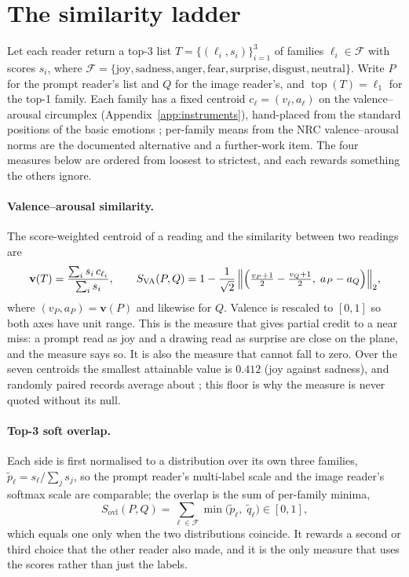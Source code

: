 \section{The similarity ladder}
\label{sec:method-measures}

Let each reader return a top-3 list $T = \{(\ell_i, s_i)\}_{i=1}^{3}$ of families $\ell_i \in \mathcal{F}$ with scores $s_i$, where $\mathcal{F} = \{\text{joy}, \text{sadness}, \text{anger}, \text{fear}, \text{surprise}, \text{disgust}, \text{neutral}\}$. Write $P$ for the prompt reader's list and $Q$ for the image reader's, and $\operatorname{top}(T) = \ell_1$ for the top-1 family. Each family has a fixed centroid $c_\ell = (v_\ell, a_\ell)$ on the valence--arousal circumplex (Appendix~\ref{app:instruments}), hand-placed from the standard positions of the basic emotions \cite{russell1980circumplex}; per-family means from the NRC valence--arousal norms \cite{mohammad2018obtaining} are the documented alternative and a further-work item. The four measures below are ordered from loosest to strictest, and each rewards something the others ignore.

\paragraph{Valence--arousal similarity.} The score-weighted centroid of a reading and the similarity between two readings are
\begin{equation}
\mathbf{v}(T) = \frac{\sum_i s_i\, c_{\ell_i}}{\sum_i s_i}, \qquad
S_{\mathrm{VA}}(P, Q) = 1 - \frac{1}{\sqrt{2}}\,\Bigl\|\Bigl(\tfrac{v_P + 1}{2} - \tfrac{v_Q + 1}{2},\; a_P - a_Q\Bigr)\Bigr\|_2 ,
\label{eq:va}
\end{equation}
where $(v_P, a_P) = \mathbf{v}(P)$ and likewise for $Q$. Valence is rescaled to $[0,1]$ so both axes have unit range. This is the measure that gives partial credit to a near miss: a prompt read as joy and a drawing read as surprise are close on the plane, and the measure says so. It is also the measure that cannot fall to zero. Over the seven centroids the smallest attainable value is $0.412$ (joy against sadness), and randomly paired records average about \FullNeuVaNull{}; this floor is why the measure is never quoted without its null.

\paragraph{Top-3 soft overlap.} Each side is first normalised to a distribution over its own three families, $\tilde{p}_\ell = s_\ell / \sum_j s_j$, so the prompt reader's multi-label scale and the image reader's softmax scale are comparable; the overlap is the sum of per-family minima,
\begin{equation}
S_{\mathrm{ovl}}(P, Q) = \sum_{\ell \in \mathcal{F}} \min\bigl(\tilde{p}_\ell,\; \tilde{q}_\ell\bigr) \in [0, 1],
\label{eq:overlap}
\end{equation}
which equals one only when the two distributions coincide. It rewards a second or third choice that the other reader also made, and it is the only measure that uses the scores rather than just the labels.

